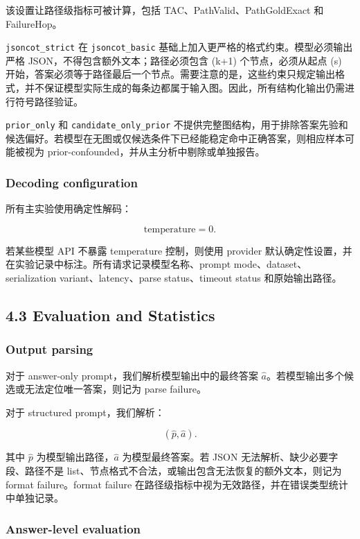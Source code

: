 \documentclass[
  11pt,
]{article}
\begin{document}
该设置让路径级指标可被计算，包括 TAC、PathValid、PathGoldExact 和
FailureHop。

\texttt{jsoncot\_strict} 在 \texttt{jsoncot\_basic}
基础上加入更严格的格式约束。模型必须输出严格
JSON，不得包含额外文本；路径必须包含 (k+1) 个节点，必须从起点 (s)
开始，答案必须等于路径最后一个节点。需要注意的是，这些约束只规定输出格式，并不保证模型实际生成的每条边都属于输入图。因此，所有结构化输出仍需进行符号路径验证。

\texttt{prior\_only} 和 \texttt{candidate\_only\_prior}
不提供完整图结构，用于排除答案先验和候选偏好。若模型在无图或仅候选条件下已经能稳定命中正确答案，则相应样本可能被视为
prior-confounded，并从主分析中剔除或单独报告。

\subsubsection{Decoding configuration}\label{decoding-configuration}

所有主实验使用确定性解码：

\[
\text{temperature}=0.  
\]

若某些模型 API 不暴露 temperature 控制，则使用 provider
默认确定性设置，并在实验记录中标注。所有请求记录模型名称、prompt
mode、dataset、serialization variant、latency、parse status、timeout
status 和原始输出路径。

\subsection{4.3 Evaluation and
Statistics}\label{evaluation-and-statistics}

\subsubsection{Output parsing}\label{output-parsing}

对于 answer-only prompt，我们解析模型输出中的最终答案
\(\hat{a}\)。若模型输出多个候选或无法定位唯一答案，则记为 parse
failure。

对于 structured prompt，我们解析：

\[
(\hat{p},\hat{a}).  
\]

其中 \(\hat{p}\) 为模型输出路径，\(\hat{a}\) 为模型最终答案。若 JSON
无法解析、缺少必要字段、路径不是
list、节点格式不合法，或输出包含无法恢复的额外文本，则记为 format
failure。format failure
在路径级指标中视为无效路径，并在错误类型统计中单独记录。

\subsubsection{Answer-level evaluation}\label{answer-level-evaluation}
\end{document}
